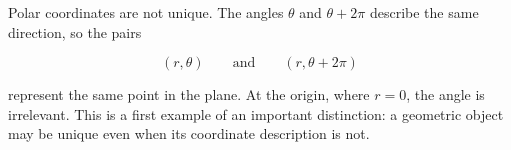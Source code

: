 \begin{remarkbox}
Polar coordinates are not unique. The angles $\theta$ and $\theta+2\pi$ describe
the same direction, so the pairs

\[
(r,\theta)
\qquad\text{and}\qquad
(r,\theta+2\pi)
\]

represent the same point in the plane. At the origin, where $r=0$, the angle is
irrelevant. This is a first example of an important distinction: a geometric
object may be unique even when its coordinate description is not.
\end{remarkbox}
